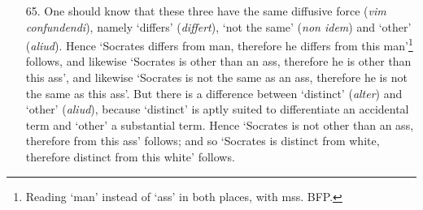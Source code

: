 \begin{itemize}
\item[65.] One should know that these three have the same diffusive force (\textit{vim confundendi}), namely `differs' (\textit{differt}), `not the same' (\textit{non idem}) and `other' (\textit{aliud}). Hence `Socrates differs from man, therefore he differs from this man'\footnote{Reading `man' instead of `ass' in both places, with mss. BFP.} follows, and likewise `Socrates is other than an ass, therefore he is other than this ass', and likewise `Socrates is not the same as an ass, therefore he is not the same as this ass'. But there is a difference between `distinct' (\textit{alter}) and `other' (\textit{aliud}), because `distinct' is aptly suited to differentiate an accidental term and `other' a substantial term. Hence `Socrates is not other than an ass, therefore from this ass' follows; and so `Socrates is distinct from white, therefore distinct from this white' follows.
\end{itemize}

